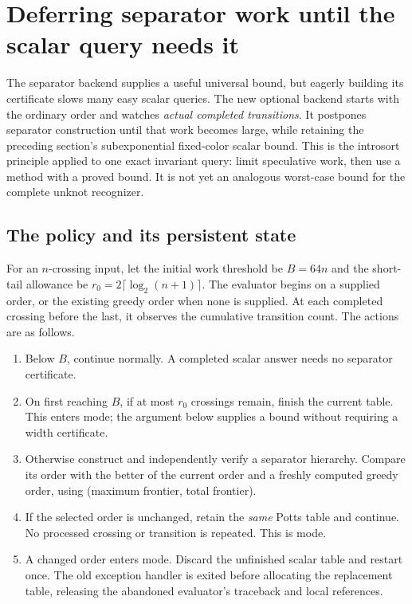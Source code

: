 \section{Deferring separator work until the scalar query needs it}
\label{sec:adaptive-potts}

The separator backend supplies a useful universal bound, but eagerly building
its certificate slows many easy scalar queries.  The new optional
 backend starts with the ordinary order and watches
\emph{actual completed transitions}.  It postpones separator construction
until that work becomes large, while retaining the preceding section's
subexponential fixed-color scalar bound.  This is the introsort principle
applied to one exact invariant query: limit speculative work, then use a
method with a proved bound.  It is not yet an analogous worst-case bound
for the complete unknot recognizer.

\subsection{The policy and its persistent state}

For an $n$-crossing input, let the initial work threshold be $B=64n$ and the
short-tail allowance be $r_0=2\lceil\log_2(n+1)\rceil$.  The evaluator begins
on a supplied order, or the existing greedy order when none is supplied.
At each completed crossing before the last, it observes the cumulative
transition count.  The actions are as follows.
\begin{enumerate}
\item Below $B$, continue normally.  A completed scalar answer needs no
separator certificate.
\item On first reaching $B$, if at most $r_0$ crossings remain, finish the
current table.  This enters  mode; the argument below
supplies a bound without requiring a width certificate.
\item Otherwise construct and independently verify a separator hierarchy.
Compare its order with the better of the current order and a freshly
computed greedy order, using (maximum frontier, total frontier).
\item If the selected order is unchanged, retain the \emph{same} Potts table
and continue.  No processed crossing or transition is repeated.  This is
 mode.
\item A changed order enters  mode.
Discard the unfinished scalar table and restart once.  The old exception handler
is exited before allocating the replacement table, releasing the abandoned
evaluator's traceback and local references.
\end{enumerate}

